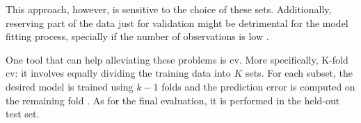 This approach, however,  is sensitive to the choice of these sets. Additionally, reserving part of the data just for validation might be detrimental for the model fitting process, specially if the number of observations is low \parencite{james2013introduction}.

One tool that can help alleviating these problems is \acrfull{cv}. More specifically,  K-fold \acrshort{cv}: it involves equally dividing the training data into $K$ sets. For each subset, the desired model is trained using $k-1$ folds and the prediction error is computed on the remaining fold \parencite{friedman2001}. As for the final evaluation, it is performed in the held-out test set.